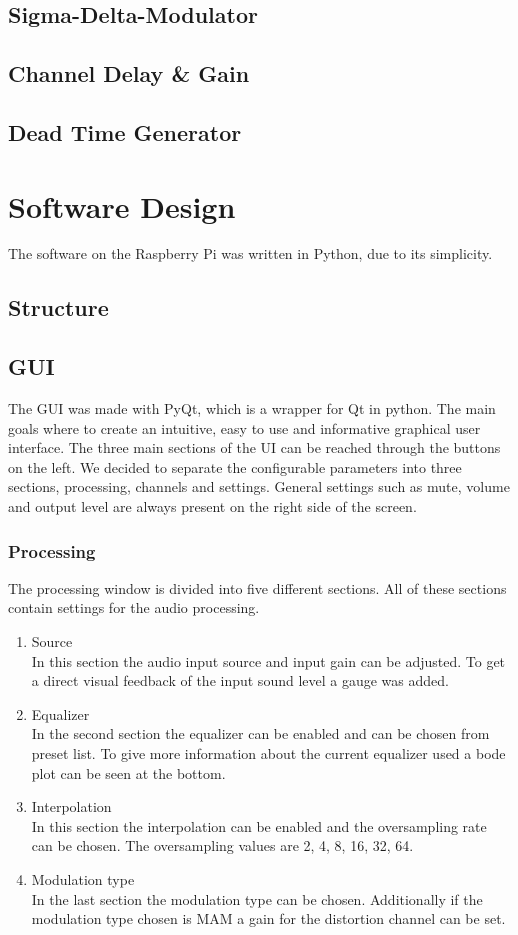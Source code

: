 \subsection{Sigma-Delta-Modulator}
\subsection{Channel Delay \& Gain}
\subsection{Dead Time Generator}


\section{Software Design}
The software on the Raspberry Pi was written in Python, due to its simplicity. 
\subsection{Structure}
\subsection{GUI}
The GUI was made with PyQt, which is a wrapper for Qt in python. The main goals where to create an intuitive, easy to use and informative graphical user interface. 
The three main sections of the UI can be reached through the buttons on the left. We decided to separate the configurable parameters into three sections, processing, channels and settings. General settings such as mute, volume and output level are always present on the right side of the screen. 
\subsubsection{Processing}
The processing window is divided into five different sections. All of these sections contain settings for the audio processing.
\begin{enumerate}
    \item Source \\
    In this section the audio input source and input gain can be adjusted. To get a direct visual feedback of the input sound level a gauge was added.
    \item Equalizer \\
     In the second section the equalizer can be enabled and can be chosen from preset list. To give more information about the current equalizer used a bode plot can be seen at the bottom. 
    \item Interpolation \\
    In this section the interpolation can be enabled and the oversampling rate can be chosen. The oversampling values are 2, 4, 8, 16, 32, 64.
    \item Modulation type \\
    In the last section the modulation type can be chosen. Additionally if the modulation type chosen is MAM a gain for the distortion channel can be set. 
\end{enumerate}

